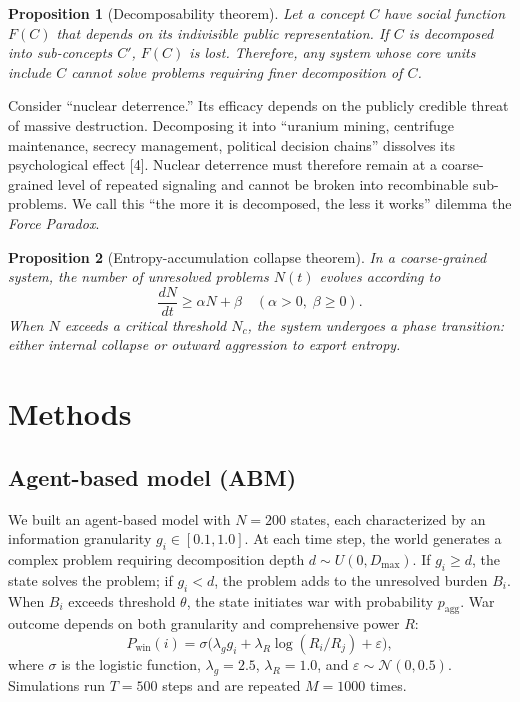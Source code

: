 \documentclass[11pt,a4paper]{article}
\newtheorem{proposition}{Proposition}
\begin{document}
\begin{proposition}[Decomposability theorem]
Let a concept $C$ have social function $F(C)$ that depends on its indivisible public representation. If $C$ is decomposed into sub-concepts $C'$, $F(C)$ is lost. Therefore, any system whose core units include $C$ cannot solve problems requiring finer decomposition of $C$.
\end{proposition}

Consider ``nuclear deterrence.'' Its efficacy depends on the publicly credible threat of massive destruction. Decomposing it into ``uranium mining, centrifuge maintenance, secrecy management, political decision chains'' dissolves its psychological effect [4]. Nuclear deterrence must therefore remain at a coarse-grained level of repeated signaling and cannot be broken into recombinable sub-problems. We call this ``the more it is decomposed, the less it works'' dilemma the \emph{Force Paradox}.

\begin{proposition}[Entropy-accumulation collapse theorem]
In a coarse-grained system, the number of unresolved problems $N(t)$ evolves according to
\[
\frac{dN}{dt} \geq \alpha N + \beta \quad (\alpha>0,\;\beta\geq0).
\]
When $N$ exceeds a critical threshold $N_c$, the system undergoes a phase transition: either internal collapse or outward aggression to export entropy.
\end{proposition}

\section{Methods}

\subsection{Agent-based model (ABM)}

We built an agent-based model with $N=200$ states, each characterized by an information granularity $g_i \in [0.1, 1.0]$. At each time step, the world generates a complex problem requiring decomposition depth $d\sim U(0, D_{\max})$. If $g_i \geq d$, the state solves the problem; if $g_i < d$, the problem adds to the unresolved burden $B_i$. When $B_i$ exceeds threshold $\theta$, the state initiates war with probability $p_{\text{agg}}$. War outcome depends on both granularity and comprehensive power $R$:
\[
P_{\text{win}}(i) = \sigma\bigl(\lambda_g g_i + \lambda_R \log(R_i/R_j) + \varepsilon\bigr),
\]
where $\sigma$ is the logistic function, $\lambda_g=2.5$, $\lambda_R=1.0$, and $\varepsilon\sim\mathcal{N}(0,0.5)$. Simulations run $T=500$ steps and are repeated $M=1000$ times.
\end{document}
